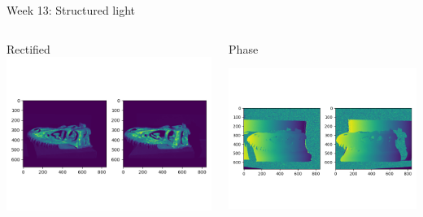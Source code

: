 \documentclass[aspectratio=169,hyperref={pdfpagelabels=false}]{beamer}
\begin{document}
\begin{frame}{ Week 13: Structured light }
	\begin{columns}
		\begin{column}{.3\textwidth}
			\begin{block}{Rectified}
			\includegraphics[width=\textwidth]{exercise_imgs/ex13-1.png}
			\end{block}
		\end{column}
		\begin{column}{.3\textwidth}
			\begin{block}{Phase}
				\begin{center}
					\includegraphics[width=\textwidth]{exercise_imgs/ex13-2.png}
				\end{center}

\end{block}
\end{column}
\end{columns}
\end{frame}
\end{document}
